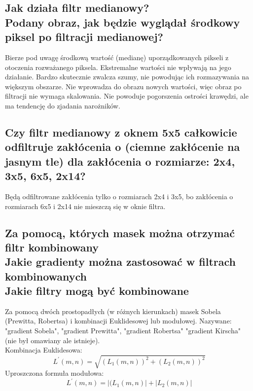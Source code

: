 \documentclass[a4paper, 12pt, titlepage]{article}
\begin{document}
\subsection{Jak działa filtr medianowy? \\ Podany obraz, jak będzie wyglądał środkowy piksel po filtracji medianowej?}
Bierze pod uwagę środkową wartość (medianę) uporządkowanych pikseli z otoczenia rozważanego piksela. Ekstremalne wartości nie wpływają na jego działanie. Bardzo skutecznie zwalcza szumy, nie powodując ich rozmazywania na większym obszarze. Nie wprowadza do obrazu nowych wartości, więc obraz po filtracji nie wymaga skalowania. Nie powoduje pogorszenia ostrości krawędzi, ale ma tendencję do zjadania narożników.

\subsection{Czy filtr medianowy z oknem 5x5 całkowicie odfiltruje zakłócenia o (ciemne zakłócenie na jasnym tle) dla zakłócenia o rozmiarze: 2x4, 3x5, 6x5, 2x14?}
Będą odfiltrowane zakłócenia tylko o rozmiarach 2x4 i 3x5, bo zakłócenia o rozmiarach 6x5 i 2x14 nie mieszczą się w oknie filtra.

\subsection{Za pomocą, których masek można otrzymać filtr kombinowany \\ Jakie gradienty można zastosować w filtrach kombinowanych \\ Jakie filtry mogą być kombinowane}
Za pomocą dwóch prostopadłych (w różnych kierunkach) masek Sobela (Prewitta, Robertsa) i kombinacji Euklidesowej lub modułowej. Nazywane: "gradient Sobela", "gradient Prewitta", "gradient Robertsa" "gradient Kirscha" (nie był omawiany ale istnieje). \\
Kombinacja Euklidesowa:
$$ L^{\prime}(m,n) = \sqrt{(L_{1}(m,n))^2+(L_{2}(m,n))^2} $$
Uproszczona formuła modułowa:
$$ L^{\prime}(m,n) = |(L_{1}(m,n)|+|L_{2}(m,n)| $$
\end{document}
